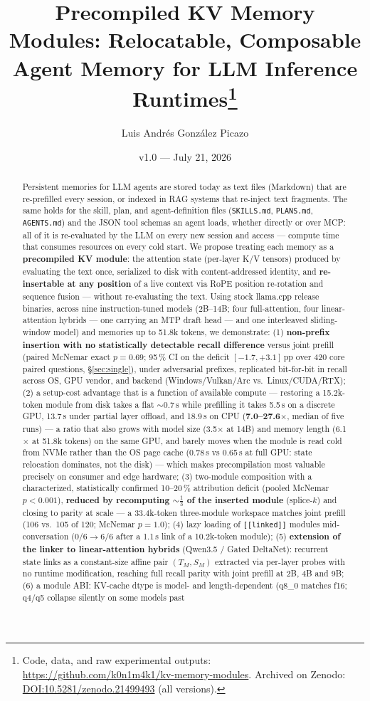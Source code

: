 \documentclass[11pt]{article}
\title{\textbf{Precompiled KV Memory Modules: Relocatable, Composable Agent Memory for LLM Inference Runtimes}\thanks{Code, data, and raw experimental outputs: \url{https://github.com/k0n1m4k1/kv-memory-modules}. Archived on Zenodo: \href{https://doi.org/10.5281/zenodo.21499493}{DOI:10.5281/zenodo.21499493} (all versions).}}
\author{Luis Andrés González Picazo}
\date{v1.0 --- July 21, 2026}
\newcommand{\code}[1]{\texttt{#1}}
\begin{document}
\maketitle

\begin{abstract}
\noindent
Persistent memories for LLM agents are stored today as text files (Markdown) that are re-prefilled every session, or indexed in RAG systems that re-inject text fragments. The same holds for the skill, plan, and agent-definition files (\code{SKILLS.md}, \code{PLANS.md}, \code{AGENTS.md}) and the JSON tool schemas an agent loads, whether directly or over MCP: all of it is re-evaluated by the LLM on every new session and access --- compute time that consumes resources on every cold start. We propose treating each memory as a \textbf{precompiled KV module}: the attention state (per-layer K/V tensors) produced by evaluating the text once, serialized to disk with content-addressed identity, and \textbf{re-insertable at any position} of a live context via RoPE position re-rotation and sequence fusion --- without re-evaluating the text. Using stock llama.cpp release binaries, across nine instruction-tuned models (2B--14B; four full-attention, four linear-attention hybrids --- one carrying an MTP draft head --- and one interleaved sliding-window model) and memories up to 51.8k tokens, we demonstrate: (1) \textbf{non-prefix insertion with no statistically detectable recall difference} versus joint prefill (paired McNemar exact $p=0.69$; 95\,\% CI on the deficit $[-1.7, +3.1]$\,pp over 420 core paired questions, \S\ref{sec:single}), under adversarial prefixes, replicated bit-for-bit in recall across OS, GPU vendor, and backend (Windows/Vulkan/Arc vs.\ Linux/CUDA/RTX); (2) a setup-cost advantage that is a function of available compute --- restoring a 15.2k-token module from disk takes a flat ${\sim}0.7$\,s while prefilling it takes 5.5\,s on a discrete GPU, 13.7\,s under partial layer offload, and 18.9\,s on CPU (\textbf{7.0--27.6$\times$}, median of five runs) --- a ratio that also grows with model size (3.5$\times$ at 14B) and memory length (6.1$\times$ at 51.8k tokens) on the same GPU, and barely moves when the module is read cold from NVMe rather than the OS page cache (0.78\,s vs 0.65\,s at full GPU: state relocation dominates, not the disk) --- which makes precompilation most valuable precisely on consumer and edge hardware; (3) two-module composition with a characterized, statistically confirmed 10--20\,\% attribution deficit (pooled McNemar $p<0.001$), \textbf{reduced by recomputing ${\sim}\tfrac{1}{3}$ of the inserted module} (splice-$k$) and closing to parity at scale --- a 33.4k-token three-module workspace matches joint prefill (106 vs.\ 105 of 120; McNemar $p=1.0$); (4) lazy loading of \code{[[linked]]} modules mid-conversation ($0/6 \to 6/6$ after a 1.1\,s link of a 10.2k-token module); (5) \textbf{extension of the linker to linear-attention hybrids} (Qwen3.5 / Gated DeltaNet): recurrent state links as a constant-size affine pair $(T_M, S_M)$ extracted via per-layer probes with no runtime modification, reaching full recall parity with joint prefill at 2B, 4B and 9B; (6) a module ABI: KV-cache dtype is model- and length-dependent (q8\_0 matches f16; q4/q5 collapse silently on some models past 
\end{abstract}
\end{document}
